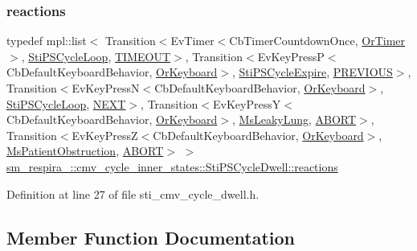 \subsubsection{\texorpdfstring{reactions}{reactions}}
{\footnotesize\ttfamily typedef mpl\+::list$<$ Transition$<$Ev\+Timer$<$Cb\+Timer\+Countdown\+Once, \hyperlink{classsm__respira__1_1_1OrTimer}{Or\+Timer}$>$, \hyperlink{structsm__respira__1_1_1cmv__cycle__inner__states_1_1StiPSCycleLoop}{Sti\+P\+S\+Cycle\+Loop}, \hyperlink{structsm__respira__1_1_1cmv__cycle__inner__states_1_1StiPSCycleDwell_1_1TIMEOUT}{T\+I\+M\+E\+O\+UT}$>$, Transition$<$Ev\+Key\+PressP$<$Cb\+Default\+Keyboard\+Behavior, \hyperlink{classsm__respira__1_1_1OrKeyboard}{Or\+Keyboard}$>$, \hyperlink{structsm__respira__1_1_1cmv__cycle__inner__states_1_1StiPSCycleExpire}{Sti\+P\+S\+Cycle\+Expire}, \hyperlink{structsm__respira__1_1_1cmv__cycle__inner__states_1_1StiPSCycleDwell_1_1PREVIOUS}{P\+R\+E\+V\+I\+O\+US}$>$, Transition$<$Ev\+Key\+PressN$<$Cb\+Default\+Keyboard\+Behavior, \hyperlink{classsm__respira__1_1_1OrKeyboard}{Or\+Keyboard}$>$, \hyperlink{structsm__respira__1_1_1cmv__cycle__inner__states_1_1StiPSCycleLoop}{Sti\+P\+S\+Cycle\+Loop}, \hyperlink{structsm__respira__1_1_1cmv__cycle__inner__states_1_1StiPSCycleDwell_1_1NEXT}{N\+E\+XT}$>$, Transition$<$Ev\+Key\+PressY$<$Cb\+Default\+Keyboard\+Behavior, \hyperlink{classsm__respira__1_1_1OrKeyboard}{Or\+Keyboard}$>$, \hyperlink{classsm__respira__1_1_1MsLeakyLung}{Ms\+Leaky\+Lung}, \hyperlink{classABORT}{A\+B\+O\+RT}$>$, Transition$<$Ev\+Key\+PressZ$<$Cb\+Default\+Keyboard\+Behavior, \hyperlink{classsm__respira__1_1_1OrKeyboard}{Or\+Keyboard}$>$, \hyperlink{classsm__respira__1_1_1MsPatientObstruction}{Ms\+Patient\+Obstruction}, \hyperlink{classABORT}{A\+B\+O\+RT}$>$ $>$ \hyperlink{structsm__respira__1_1_1cmv__cycle__inner__states_1_1StiPSCycleDwell_a393e74db3d401609684a11fb37bd23ce}{sm\+\_\+respira\+\_\+::cmv\+\_\+cycle\+\_\+inner\+\_\+states\+::\+Sti\+P\+S\+Cycle\+Dwell\+::reactions}}



Definition at line 27 of file sti\+\_\+cmv\+\_\+cycle\+\_\+dwell.\+h.



\subsection{Member Function Documentation}
\mbox{\label{structsm__respira__1_1_1cmv__cycle__inner__states_1_1StiPSCycleDwell_a4d68bfae4c76af28ef00ccea5574264d}} 
